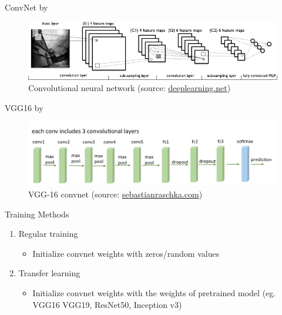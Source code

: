 \documentclass[10pt]{beamer}
\begin{document}
\begin{frame}{ConvNet by \cite{lecun2015deep}}

	\begin{figure}
		\centering
		\includegraphics[width=1.0\linewidth]{lenet}
		\caption{Convolutional neural network (source: \url{deeplearning.net})}
		\label{fig_convnet}
    \end{figure}

\end{frame}

\begin{frame}{VGG16 by \cite{simonyan2014very}}

	\begin{figure}
		\centering
		\includegraphics[width=1.0\linewidth]{vgg16arch}
		\caption{VGG-16 convnet (source: \url{sebastianraschka.com})}
		\label{fig_convnet_vgg16}
    \end{figure}

\end{frame}

\begin{frame}{Training Methods}

	\begin{enumerate}[<+->]
		\item Regular training
		\begin{itemize}
			\item Initialize convnet weights with zeros/random values
		\end{itemize}
		\item Transfer learning
		\begin{itemize}
			\item Initialize convnet weights with the weights of pretrained model (eg. VGG16 VGG19, ResNet50, Inception v3)
		\end{itemize}
	\end{enumerate}

\end{frame}
\end{document}

